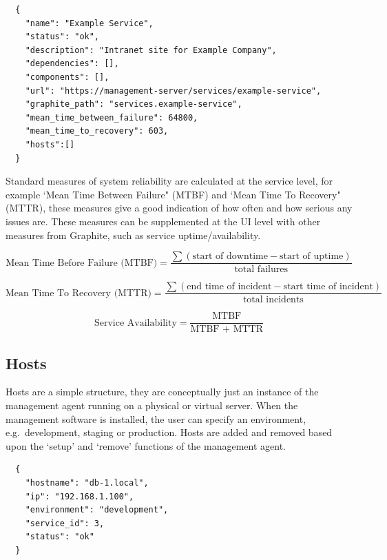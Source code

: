 \documentclass{cshonours}
\begin{document}
\begin{listing}[h]
\begin{verbatim}
  {
    "name": "Example Service",
    "status": "ok",
    "description": "Intranet site for Example Company",
    "dependencies": [],
    "components": [],
    "url": "https://management-server/services/example-service",
    "graphite_path": "services.example-service",
    "mean_time_between_failure": 64800,
    "mean_time_to_recovery": 603,
    "hosts":[]
  }
\end{verbatim}
\end{listing}

Standard measures of system reliability are calculated at the service level, for example `Mean Time Between Failure" (MTBF) and `Mean Time To Recovery" (MTTR), these measures give a good indication of how often and how serious any issues are. These measures can be supplemented at the UI level with other measures from Graphite, such as service uptime/availability.

\begin{equation}
  \mbox{Mean Time Before Failure (MTBF)}= \frac{\sum{(\mbox{start of downtime} - \mbox{start of uptime})}}{\mbox{total failures}}
\end{equation}

\begin{equation}
  \mbox{Mean Time To Recovery (MTTR)}= \frac{\sum{(\mbox{end time of incident} - \mbox{start time of incident})}}{\mbox{total incidents}}
\end{equation}

\begin{equation}
  \mbox{Service Availability}= \frac{\mbox{MTBF}}{\mbox{MTBF + MTTR}}
\end{equation}

\pagebreak
\subsection{Hosts}
Hosts are a simple structure, they are conceptually just an instance of the management agent running on a physical or virtual server. When the management software is installed, the user can specify an environment, e.g.\ development, staging or production. Hosts are added and removed based upon the `setup' and `remove' functions of the management agent.

\begin{listing}[h]
\begin{verbatim}
  {
    "hostname": "db-1.local",
    "ip": "192.168.1.100",
    "environment": "development",
    "service_id": 3,
    "status": "ok"
  }
\end{verbatim}
\end{listing}
\end{document}
